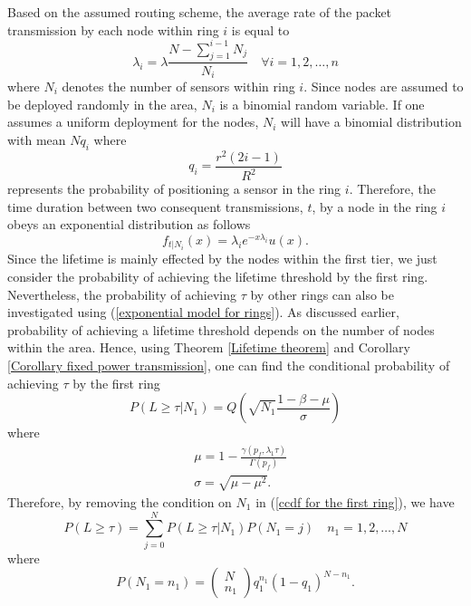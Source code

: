 \documentclass[conference]{IEEEtran}
\newcommand{\nchoosek}[2]{\left(\begin{array}{c}#1\\#2\end{array}\right)}
\begin{document}
Based on the assumed routing scheme, the average rate of the packet
transmission by each node within ring $i$ is equal to
\begin{equation}\label{lambda of tiers}
\lambda_i = \lambda \frac{N - \sum_{j=1}^{i-1} N_j}{N_i} \quad
\forall i = 1,2,\ldots,n
\end{equation}
where $N_i$ denotes the number of sensors within ring $i$. Since
nodes are assumed to be deployed randomly in the area, $N_i$ is a
binomial random variable. If one assumes a uniform deployment for
the nodes, $N_i$ will have a binomial distribution with mean $Nq_i$
where
\begin{equation}\label{binomial chance for rings}
q_i = \frac{r^2 (2i - 1)}{R^2}
\end{equation}
represents the probability of positioning a sensor in the ring $i$.
Therefore, the time duration between two consequent transmissions,
$t$, by a node in the ring $i$ obeys an exponential distribution as
follows
\begin{equation}\label{exponential model for rings}
f_{t \vert N_i}(x) = \lambda_i e^{-x \lambda_i} u(x).
\end{equation}
Since the lifetime is mainly effected by the nodes within the first
tier, we just consider the probability of achieving the lifetime
threshold by the first ring. Nevertheless, the probability of
achieving $\tau$ by other rings can also be investigated using
(\ref{exponential model for rings}). As discussed earlier,
probability of achieving a lifetime threshold depends on the number
of nodes within the area. Hence, using Theorem \ref{Lifetime
theorem} and Corollary \ref{Corollary fixed power transmission}, one
can find the conditional probability of achieving $\tau$ by the
first ring
\begin{equation}\label{ccdf for the first ring}
P(L\geq \tau \vert N_1) = Q \left(\sqrt{N_1} \frac{1 - \beta -
\mu}{\sigma}\right)
\end{equation}
where
\begin{align}
&\mu = 1 - \frac{\gamma(p_f,\lambda_1\tau)}{\Gamma(p_f)} \\
&\sigma = \sqrt{\mu - \mu^2}.
\end{align}
Therefore, by removing the condition on $N_1$ in (\ref{ccdf for the
first ring}), we have
\begin{equation}\label{Unconditioing Ni}
P(L\geq \tau) = \sum_{j=0}^N P(L\geq \tau \vert N_1) P(N_1 = j)\quad
n_1 = 1,2,\ldots,N
\end{equation}
where
\begin{equation}
P(N_1 = n_1) = \nchoosek{N}{n_1} q_1^{n_1} (1- q_1)^{N - n_1}.
\end{equation}
\end{document}
